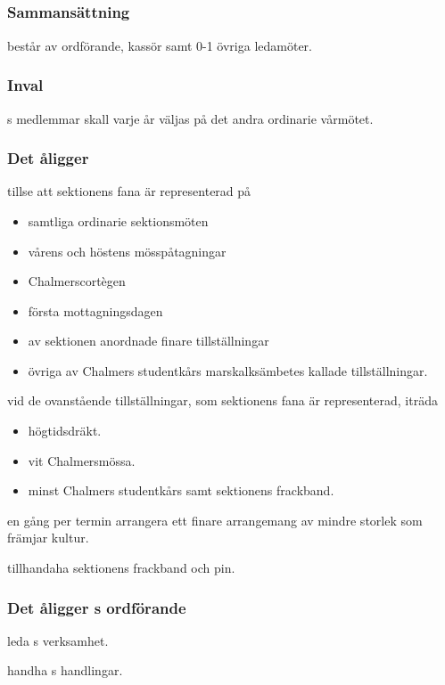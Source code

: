\subsection{\FANBARERITFULL}
\subsubsection{Sammansättning}
\FANBARERIT{} består av ordförande, kassör samt 0-1 övriga ledamöter.

\subsubsection{Inval}
\FANBARERIT{}s medlemmar skall varje år väljas på det andra ordinarie vårmötet.

\subsubsection{Det åligger \FANBARERIT}
\label{sec:fanbarerit:function}
\begin{att}
	\item tillse att sektionens fana är representerad på
	\begin{itemize}
		\item samtliga ordinarie sektionsmöten
		\item vårens och höstens mösspåtagningar
		\item Chalmerscortègen
		\item första mottagningsdagen
		\item av sektionen anordnade finare tillställningar
		\item övriga av Chalmers studentkårs marskalksämbetes kallade tillställningar.
	\end{itemize}
	\item vid de ovanstående tillställningar, som sektionens fana är representerad, iträda
	\begin{itemize}
		\item högtidsdräkt.
		\item vit Chalmersmössa.
		\item minst Chalmers studentkårs samt sektionens frackband.
	\end{itemize}
	\item en gång per termin arrangera ett finare arrangemang av mindre storlek som främjar kultur.
	\item tillhandaha sektionens frackband och pin.
\end{att}

\subsubsection{Det åligger \FANBARERIT{}s ordförande}
\begin{att}
	\item leda \FANBARERIT{}s verksamhet.
	\item handha \FANBARERIT{}s handlingar.
\end{att}

